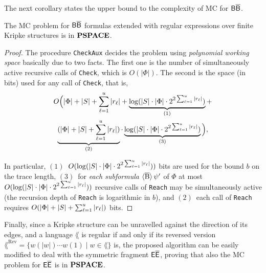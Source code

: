 The next corollary states the upper bound to the complexity of MC for $\mathsf{B}\mathsf{\overline{B}}$.
\begin{corollary}
The MC problem for $\mathsf{B}\mathsf{\overline{B}}$ formulas extended with regular expressions over finite Kripke structures is in $\textbf{PSPACE}$.
\end{corollary}
\begin{proof}
    The procedure \texttt{CheckAux} decides the problem using \emph{polynomial working space} basically due to two facts. 
    The first one is the number of simultaneously active recursive calls of \texttt{Check}, which is $O(|\Phi|)$.
    The second is the space (in bits) used for any call of \texttt{Check}, that is,
        \begin{multline*}
            O\Big(|\Phi| + |S| + \sum_{\ell=1}^u |r_\ell| + \underbrace{\log (|S|\cdot |\Phi|\cdot 2^{2\sum_{\ell=1}^u |r_\ell|})}_{(1)} +\\
            \underbrace{(|\Phi| + |S| + \sum_{\ell=1}^u |r_\ell|)}_{(2)}\cdot\underbrace{\log (|S|\cdot |\Phi|\cdot 2^{2\sum_{\ell=1}^u |r_\ell|})}_{(3)}\Big),
        \end{multline*}
         
        In particular, $(1)$~$O(\log (|S|\cdot |\Phi|\cdot 2^{2\sum_{\ell=1}^u |r_\ell|}))$ bits are used for the bound $b$ on the trace length, $(3)$~for \emph{each subformula} $\operatorname{\langle \overline{B}\rangle}\psi'$ of $\Phi$ at most $O(\log (|S|\cdot |\Phi|\cdot 2^{2\sum_{\ell=1}^u |r_\ell|}))$ recursive calls of \texttt{Reach} may be simultaneously active (the recursion depth of \texttt{Reach} is logarithmic in $b$), and $(2)$~each call of \texttt{Reach} requires $O(|\Phi| + |S| + \sum_{\ell=1}^u |r_\ell|)$ bits.\qedhere
%    
\end{proof}

Finally, since a Kripke structure can be unravelled against the direction of its edges,
and a language $\lang$ is regular if and only if its reversed version $\lang^{\text{Rev}}=\{w(|w|)\cdots w(1)\mid w\in\lang\}$ is, the proposed algorithm can be easily modified to deal with the symmetric fragment $\mathsf{E}\mathsf{\overline{E}}$, proving that also the MC problem for $\mathsf{E}\mathsf{\overline{E}}$ is in $\textbf{PSPACE}$.

